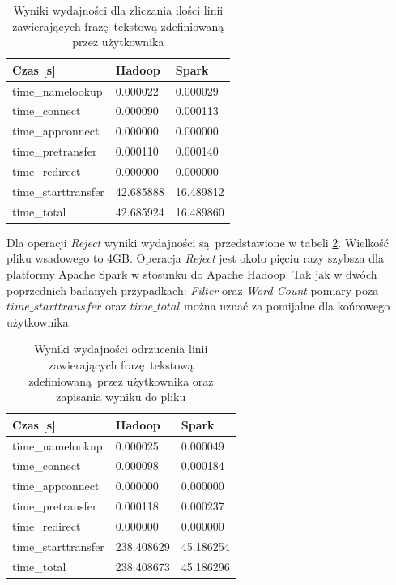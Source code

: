 \begin{table}[]
	\centering
	\caption{Wyniki wydajności dla zliczania ilości linii zawierających frazę tekstową zdefiniowaną przez użytkownika}
	\label{tab:filter-results}
	\begin{tabular}{|l|l|l|}
		\hline
		Czas [s]    & Hadoop    & Spark     \\ \hline
		time\_namelookup    & 0.000022  & 0.000029  \\ \hline
		time\_connect       & 0.000090  & 0.000113  \\ \hline
		time\_appconnect    & 0.000000  & 0.000000  \\ \hline
		time\_pretransfer   & 0.000110  & 0.000140  \\ \hline
		time\_redirect      & 0.000000  & 0.000000  \\ \hline
		time\_starttransfer & 42.685888 & 16.489812 \\ \hline
		time\_total         & 42.685924 & 16.489860 \\ \hline
	\end{tabular}
\end{table}
\newline Dla operacji \textit{Reject} wyniki wydajności są przedstawione w tabeli \ref{tab:reject-results}. Wielkość pliku wsadowego to 4GB. Operacja \textit{Reject} jest około pięciu razy szybsza dla platformy Apache Spark w stosunku do Apache Hadoop. Tak jak w dwóch poprzednich badanych przypadkach: \textit{Filter} oraz \textit{Word Count} pomiary poza $time\_starttransfer$ oraz $time\_total$ można uznać za pomijalne dla końcowego użytkownika.
\begin{table}[]
	\centering
	\caption{Wyniki wydajności odrzucenia linii zawierających frazę tekstową zdefiniowaną przez użytkownika oraz zapisania wyniku do pliku}
	\label{tab:reject-results}
	\begin{tabular}{|l|l|l|}
		\hline
		Czas [s]    & Hadoop     & Spark     \\ \hline
		time\_namelookup    & 0.000025   & 0.000049  \\ \hline
		time\_connect       & 0.000098   & 0.000184  \\ \hline
		time\_appconnect    & 0.000000   & 0.000000  \\ \hline
		time\_pretransfer   & 0.000118   & 0.000237  \\ \hline
		time\_redirect      & 0.000000   & 0.000000  \\ \hline
		time\_starttransfer & 238.408629 & 45.186254 \\ \hline
		time\_total         & 238.408673 & 45.186296 \\ \hline
	\end{tabular}
\end{table}

